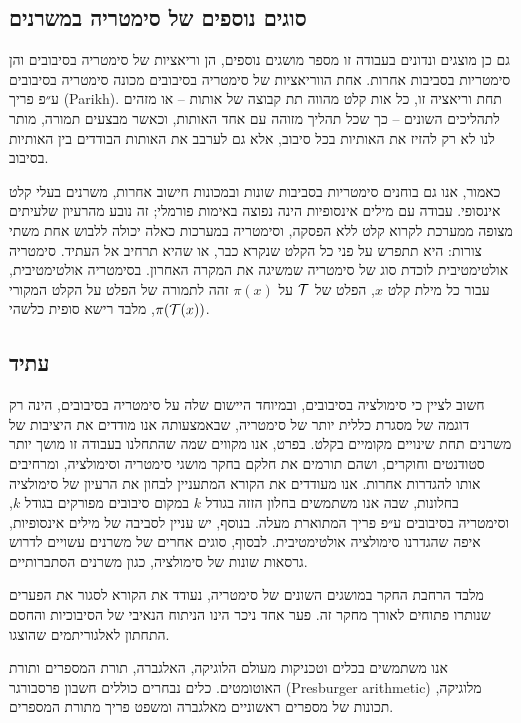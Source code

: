 {\subsection*{\texthebrew{סוגים נוספים של סימטריה במשרנים}}

גם כן מוצגים ונדונים בעבודה זו מספר מושגים נוספים, הן וריאציות של סימטריה בסיבובים והן סימטריות בסביבות אחרות. אחת הווריאציות של סימטריה בסיבובים מכונה סימטריה בסיבובים ע״פ פריך 
(\textenglish{Parikh}).
תחת וריאציה זו, כל אות קלט מהווה תת קבוצה של אותות – או מזהים לתהליכים השונים – כך שכל תהליך מזוהה עם אחד האותות, וכאשר מבצעים תמורה, מותר לנו לא רק להזיז את האותיות בכל סיבוב, אלא גם לערבב את האותות הבודדים בין האותיות בסיבוב.

כאמור, אנו גם בוחנים סימטריות בסביבות שונות ובמכונות חישוב אחרות, משרנים בעלי קלט אינסופי. עבודה עם מילים אינסופיות הינה נפוצה באימות פורמלי; זה נובע מהרעיון שלעיתים מצופה ממערכת לקרוא קלט ללא הפסקה, וסימטריה במערכות כאלה יכולה ללבוש אחת משתי צורות: היא תתפרש על פני כל הקלט שנקרא כבר, או שהיא תרחיב אל העתיד. סימטריה אולטימטיבית לוכדת סוג של סימטריה שמשיגה את המקרה האחרון. בסימטריה אולטימטיבית, עבור כל מילת קלט
$x$,
הפלט של
$\mathcal{T}$
על
$\pi(x)$
זהה לתמורה של הפלט על הקלט המקורי
$\pi(\mathcal{T}(x))$,
מלבד רישא סופית כלשהי.

\subsection*{\texthebrew{עתיד}}

חשוב לציין כי סימולציה בסיבובים, ובמיוחד היישום שלה על סימטריה בסיבובים, הינה רק דוגמה של מסגרת כללית יותר של סימטריה, שבאמצעותה אנו מודדים את היציבות של משרנים תחת שינויים מקומיים בקלט. בפרט, אנו מקווים שמה שהתחלנו בעבודה זו מושך יותר סטודנטים וחוקרים, ושהם תורמים את חלקם בחקר מושגי סימטריה וסימולציה, ומרחיבים אותו להגדרות אחרות. אנו מעודדים את הקורא המתעניין לבחון את הרעיון של סימולציה בחלונות, שבה אנו משתמשים בחלון הזזה בגודל
$k$
במקום סיבובים מפורקים בגודל
$k$,
וסימטריה בסיבובים ע״פ פריך המתוארת מעלה. בנוסף, יש עניין לסביבה של מילים אינסופיות, איפה שהגדרנו סימולציה אולטימטיבית. לבסוף, סוגים אחרים של משרנים עשויים לדרוש גרסאות שונות של סימולציה, כגון משרנים הסתברותיים. 

מלבד הרחבת החקר במושגים השונים של סימטריה, נעודד את הקורא לסגור את הפערים שנותרו פתוחים לאורך מחקר זה. פער אחד ניכר הינו הניתוח הנאיבי של הסיבוכיות והחסם התחתון לאלגוריתמים שהוצגו.

אנו משתמשים בכלים וטכניקות מעולם הלוגיקה, האלגברה, תורת המספרים ותורת האוטומטים. כלים נבחרים כוללים חשבון פרסבורגר
(\textenglish{Presburger arithmetic})
מלוגיקה, תכונות של מספרים ראשוניים מאלגברה ומשפט פריך מתורת המספרים.

}

